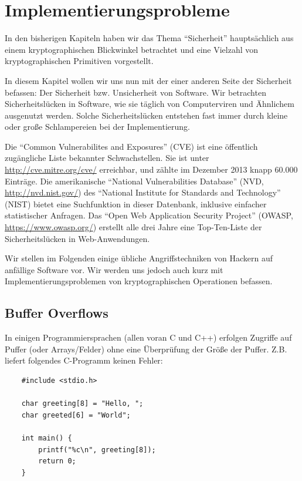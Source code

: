 
\chapter{Implementierungsprobleme}

In den bisherigen Kapiteln haben wir das Thema "`Sicherheit"' hauptsächlich aus einem kryptographischen Blickwinkel betrachtet und eine Vielzahl von kryptographischen Primitiven vorgestellt.

In diesem Kapitel wollen wir uns nun mit der einer anderen Seite der Sicherheit befassen: Der Sicherheit bzw. Unsicherheit von Software. Wir betrachten Sicherheitslücken in Software, wie sie täglich von Computerviren und Ähnlichem ausgenutzt werden. Solche Sicherheitslücken entstehen fast immer durch kleine oder große Schlampereien bei der Implementierung.

Die "`Common Vulnerabilites and Exposures"' (CVE) ist eine öffentlich zugängliche Liste bekannter Schwachstellen.
Sie ist unter \url{http://cve.mitre.org/cve/} erreichbar, und zählte im Dezember 2013 knapp 60.000 Einträge.
Die amerikanische "`National Vulnerabilities Database"' (NVD, \url{http://nvd.nist.gov/}) des "`National Institute for Standards and Technology"' (NIST) bietet eine Suchfunktion in dieser Datenbank, inklusive einfacher statistischer Anfragen.
Das "`Open Web Application Security Project"' (OWASP, \url{https://www.owasp.org/}) erstellt alle drei Jahre eine Top-Ten-Liste der Sicherheitslücken in Web-Anwendungen.

Wir stellen im Folgenden einige übliche Angriffstechniken von Hackern auf anfällige Software vor. Wir werden uns jedoch auch kurz mit Implementierungsproblemen von kryptographischen Operationen befassen.

\section{Buffer Overflows}
In einigen Programmiersprachen (allen voran C und C++) erfolgen Zugriffe auf Puffer (oder Arrays/Felder) ohne eine Überprüfung der Größe der Puffer. Z.B. liefert folgendes C-Programm keinen Fehler:


\begin{lstlisting}
	#include <stdio.h>
	
	char greeting[8] = "Hello, ";
	char greeted[6] = "World";
	
	int main() {
		printf("%c\n", greeting[8]);
		return 0;
	}
\end{lstlisting}


